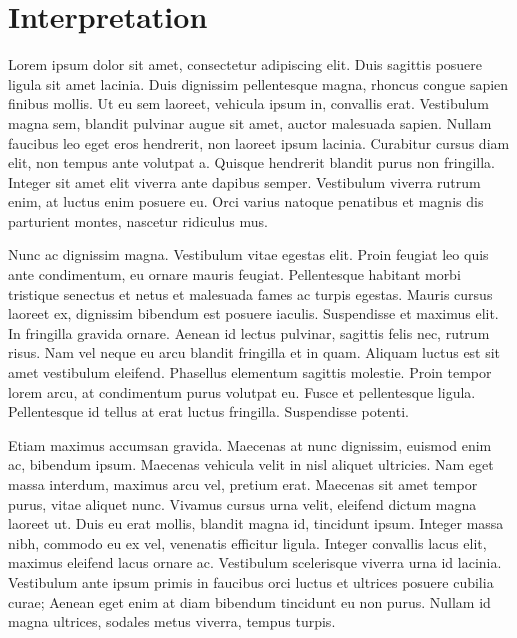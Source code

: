 \documentclass[
  ngerman,
  14pt,
  a4paper,
  DIV=11,
  twoside]{scrreprt}
\begin{document}

\chapter{Interpretation}\label{interpretation}

Lorem ipsum dolor sit amet, consectetur adipiscing elit. Duis sagittis
posuere ligula sit amet lacinia. Duis dignissim pellentesque magna,
rhoncus congue sapien finibus mollis. Ut eu sem laoreet, vehicula ipsum
in, convallis erat. Vestibulum magna sem, blandit pulvinar augue sit
amet, auctor malesuada sapien. Nullam faucibus leo eget eros hendrerit,
non laoreet ipsum lacinia. Curabitur cursus diam elit, non tempus ante
volutpat a. Quisque hendrerit blandit purus non fringilla. Integer sit
amet elit viverra ante dapibus semper. Vestibulum viverra rutrum enim,
at luctus enim posuere eu. Orci varius natoque penatibus et magnis dis
parturient montes, nascetur ridiculus mus.

Nunc ac dignissim magna. Vestibulum vitae egestas elit. Proin feugiat
leo quis ante condimentum, eu ornare mauris feugiat. Pellentesque
habitant morbi tristique senectus et netus et malesuada fames ac turpis
egestas. Mauris cursus laoreet ex, dignissim bibendum est posuere
iaculis. Suspendisse et maximus elit. In fringilla gravida ornare.
Aenean id lectus pulvinar, sagittis felis nec, rutrum risus. Nam vel
neque eu arcu blandit fringilla et in quam. Aliquam luctus est sit amet
vestibulum eleifend. Phasellus elementum sagittis molestie. Proin tempor
lorem arcu, at condimentum purus volutpat eu. Fusce et pellentesque
ligula. Pellentesque id tellus at erat luctus fringilla. Suspendisse
potenti.

Etiam maximus accumsan gravida. Maecenas at nunc dignissim, euismod enim
ac, bibendum ipsum. Maecenas vehicula velit in nisl aliquet ultricies.
Nam eget massa interdum, maximus arcu vel, pretium erat. Maecenas sit
amet tempor purus, vitae aliquet nunc. Vivamus cursus urna velit,
eleifend dictum magna laoreet ut. Duis eu erat mollis, blandit magna id,
tincidunt ipsum. Integer massa nibh, commodo eu ex vel, venenatis
efficitur ligula. Integer convallis lacus elit, maximus eleifend lacus
ornare ac. Vestibulum scelerisque viverra urna id lacinia. Vestibulum
ante ipsum primis in faucibus orci luctus et ultrices posuere cubilia
curae; Aenean eget enim at diam bibendum tincidunt eu non purus. Nullam
id magna ultrices, sodales metus viverra, tempus turpis.
\end{document}
